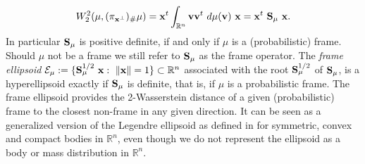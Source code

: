 \documentclass{amsart}
\numberwithin{equation}{section}
\newcommand\cE{{\mathcal E}}
\newcommand\bS{{\bf S}}
\newcommand\R{{\mathbb R}}
\theoremstyle{plain}
\theoremstyle{definition}
\begin{document}
\begin{equation} \label{int:Wasserstein_Frame}
W^2_2(\mu, (\pi_{{\bf x}^{\perp}})_{\#}\mu)={\bf x}^t \int_{\mathbb{R}^n} {\bf v} {\bf v}^t \ d\mu({\bf v})\ {\bf x}={\bf x}^t \ {\bf S_{\mu}}\ {\bf x}. \end{equation}
In particular $\bS_{\mu}$ is positive definite, if and only if $\mu$ is a (probabilistic) frame. 
Should $\mu$ not be a frame we still refer to $\bS_{\mu}$ as the frame operator. 
The {\em frame ellipsoid} $\cE_{\mu}:=\{{\bf S}^{1/2}_{\mu}\ {\bf x}: \  \|{\bf x}\|=1   \} \subset  \mathbb{R}^n$ 
associated with the root ${\bf S}^{1/2}_{\mu}$ of ${\bf S}_{\mu}$, is a hyperellipsoid exactly if ${\bf S}_{\mu}$ is definite, that is, if $\mu$ is a probabilistic frame. 
The frame ellipsoid provides the 2-Wasserstein distance of a given (probabilistic) frame to the closest non-frame in any given direction. 
It can be seen as a generalized version of the Legendre ellipsoid as defined in \cite{milman_pajor_82} 
for symmetric, convex and compact bodies in $\R^n$, even though we do not represent the ellipsoid as a body or mass distribution in $\R^n$.  
\end{document}
